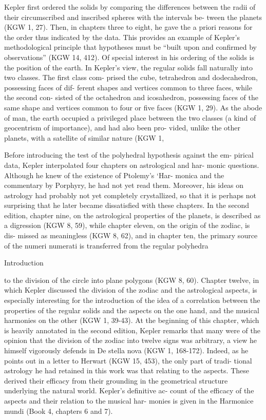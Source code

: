 \documentclass{article}
\begin{document}
Kepler first ordered the solids by comparing the differences between the
radii of their circumscribed and inscribed spheres with the intervals be-
tween the planets (KGW 1, 27). Then, in chapters three to eight, he gave
the a priori reasons for the order thus indicated by the data. This provides
an example of Kepler’s methodological principle that hypotheses must be
“built upon and confirmed by observations” (KGW 14, 412). Of special
interest in his ordering of the solids is the position of the earth. In Kepler’s
view, the regular solids fall naturally into two classes. The first class com-
prised the cube, tetrahedron and dodecahedron, possessing faces of dif-
ferent shapes and vertices common to three faces, while the second con-
sisted of the octahedron and icosahedron, possessing faces of the same
shape and vertices common to four or five faces (KGW 1, 29). As the
abode of man, the earth occupied a privileged place between the two
classes (a kind of geocentrism of importance), and had also been pro-
vided, unlike the other planets, with a satellite of similar nature (KGW 1,

Before introducing the test of the polyhedral hypothesis against the em-
pirical data, Kepler interpolated four chapters on astrological and har-
monic questions. Although he knew of the existence of Ptolemy’s ‘Har-
monica and the commentary by Porphyry, he had not yet read them.
Moreover, his ideas on astrology had probably not yet completely
crystallized, so that it is perhaps not surprising that he later became
dissatisfied with these chapters. In the second edition, chapter nine, on
the astrological properties of the planets, is described as a digression
(KGW 8, 59), while chapter eleven, on the origin of the zodiac, is dis-
missed as meaningless (KGW 8, 62), and in chapter ten, the primary
source of the numeri numerati is transferred from the regular polyhedra

Introduction

to the division of the circle into plane polygons (KGW 8, 60). Chapter
twelve, in which Kepler discussed the division of the zodiac and the
astrological aspects, is especially interesting for the introduction of the
idea of a correlation between the properties of the regular solids and the
aspects on the one hand, and the musical harmonies on the other (KGW 1,
39-43). At the beginning of this chapter, which is heavily annotated in the
second edition, Kepler remarks that many were of the opinion that the
division of the zodiac into twelve signs was arbitrary, a view he himself
vigorously defends in De stella nova (KGW 1, 168-172). Indeed, as he
points out in a letter to Herwart (KGW 15, 453), the only part of tradi-
tional astrology he had retained in this work was that relating to the
aspects. These derived their efficacy from their grounding in the
geometrical structure underlying the natural world. Kepler’s definitive ac-
count of the efficacy of the aspects and their relation to the musical har-
monies is given in the Harmonice mundi (Book 4, chapters 6 and 7).
\end{document}
